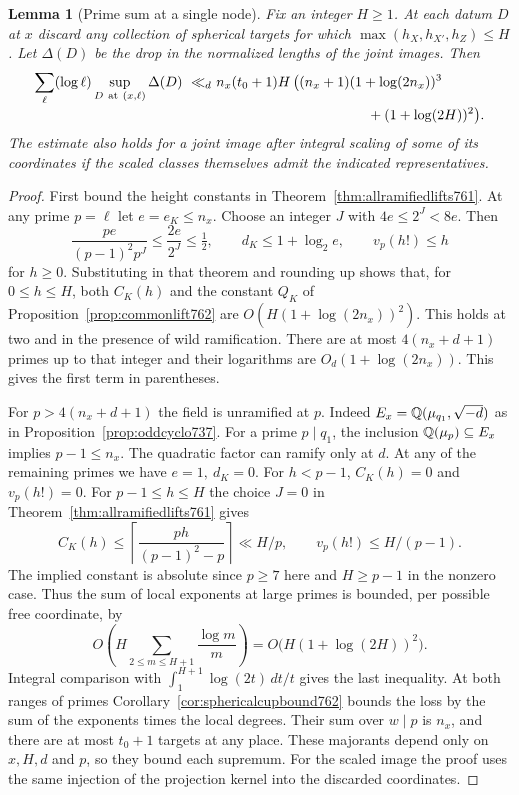 \documentclass[a4paper,11pt]{article}
\newtheorem{lemma}[proposition]{Lemma}
\theoremstyle{definition}
\theoremstyle{remark}
\numberwithin{equation}{section}
\begin{document}
\begin{lemma}[Prime sum at a single node]
\leavevmode\label{lem:sumcupheight763}
Fix an integer \(H\ge1\). At each datum \(D\) at \(x\)
discard any collection of spherical targets for which
\(\max(h_X,h_{X'},h_Z)\le H\). Let \(\Delta(D)\) be the
drop in the normalized lengths of the joint images. Then
\[
\begin{aligned}
 \sum_\ell (\log\ell)\sup_{D\ {\rm at}\ (x,\ell)}\Delta(D)
 \ \ll_d\ &n_x(t_0+1)H\,
 \bigl((n_x+1)(1+\log(2n_x))^3\\[-2pt]
 &\hspace{38mm}{}+(1+\log(2H))^2\bigr).
\end{aligned}
\]
The estimate also holds for a joint image after integral
scaling of some of its coordinates if the scaled classes
themselves admit the indicated representatives.
\end{lemma}
\begin{proof}
First bound the height constants in
Theorem~\ref{thm:allramifiedlifts761}. At any prime \(p=\ell\)
let \(e=e_K\le n_x\). Choose an integer \(J\) with
\(4e\le 2^J<8e\). Then
\[
 \frac{pe}{(p-1)^2p^J}\le\frac{2e}{2^J}\le\tfrac12,\qquad
 d_K\le 1+\log_2 e,\qquad v_p(h!)\le h
\]
for \(h\ge0\). Substituting in that theorem and rounding up
shows that, for \(0\le h\le H\), both \(C_K(h)\) and the
constant \(Q_K\) of Proposition~\ref{prop:commonlift762}
are \(O(H(1+\log(2n_x))^2)\). This holds at two and in
the presence of wild ramification. There are at most
\(4(n_x+d+1)\) primes up to that integer and their logarithms
are \(O_d(1+\log(2n_x))\). This gives the first term in
parentheses.

For \(p>4(n_x+d+1)\) the field is unramified at \(p\).
Indeed \(E_x=\mathbb Q(\mu_{q_1},\sqrt{-d})\) as in
Proposition~\ref{prop:oddcyclo737}. For a prime \(p\mid q_1\),
the inclusion \(\mathbb Q(\mu_p)\subseteq E_x\) implies
\(p-1\le n_x\). The quadratic factor can ramify only at \(d\).
At any of the remaining primes we have \(e=1,\ d_K=0\).
For \(h<p-1\), \(C_K(h)=0\) and \(v_p(h!)=0\).
For \(p-1\le h\le H\) the choice \(J=0\) in
Theorem~\ref{thm:allramifiedlifts761} gives
\[
 C_K(h)\le
    \left\lceil\frac{p h}{(p-1)^2-p}\right\rceil
       \ll H/p,\qquad v_p(h!)\le H/(p-1).
\]
The implied constant is absolute since \(p\ge 7\) here and
\(H\ge p-1\) in the nonzero case. Thus the sum of local
exponents at large primes is bounded, per possible free
coordinate, by
\[
             O\left(H\sum_{2\le m\le H+1}
                              \frac{\log m}{m}\right)
                 =O\bigl(H(1+\log(2H))^2\bigr).
\]
Integral comparison with \(\int_1^{H+1}\log(2t)\,dt/t\)
gives the last inequality. At both ranges of primes
Corollary~\ref{cor:sphericalcupbound762} bounds the loss by
the sum of the exponents times the local degrees. Their
sum over \(w\mid p\) is \(n_x\), and there are at most
\(t_0+1\) targets at any place. These majorants depend
only on \(x,H,d\) and \(p\), so they bound each supremum.
For the scaled image the proof uses the same injection of
the projection kernel into the discarded coordinates.
\end{proof}
\end{document}
